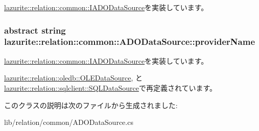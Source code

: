 \hyperlink{interfacelazurite_1_1relation_1_1common_1_1_i_a_d_o_data_source_a6bbdd4ce8e7e7c36be1af7a17e382b04}{lazurite::relation::common::IADODataSource}を実装しています。\hypertarget{classlazurite_1_1relation_1_1common_1_1_a_d_o_data_source_ad238c170cf658cfdc3a1cf1843aeb956}{
\subsubsection[{providerName}]{\setlength{\rightskip}{0pt plus 5cm}abstract string lazurite::relation::common::ADODataSource::providerName}}
\label{classlazurite_1_1relation_1_1common_1_1_a_d_o_data_source_ad238c170cf658cfdc3a1cf1843aeb956}


\hyperlink{interfacelazurite_1_1relation_1_1common_1_1_i_a_d_o_data_source_a19f2ca3d6bc754ef3e2f2a7ff88f778c}{lazurite::relation::common::IADODataSource}を実装しています。

\hyperlink{classlazurite_1_1relation_1_1oledb_1_1_o_l_e_data_source_a69a5bde74764439a3b30a1e7787339ce}{lazurite::relation::oledb::OLEDataSource}, と \hyperlink{classlazurite_1_1relation_1_1sqlclient_1_1_s_q_l_data_source_afb9ccecb64b77e0ff36d1b55a52af87f}{lazurite::relation::sqlclient::SQLDataSource}で再定義されています。

このクラスの説明は次のファイルから生成されました:\begin{DoxyCompactItemize}
\item 
lib/relation/common/ADODataSource.cs\end{DoxyCompactItemize}
